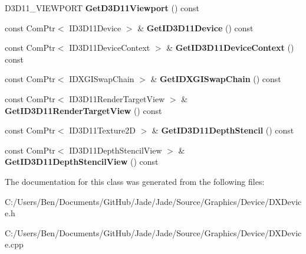 \begin{DoxyCompactItemize}
\item 
\hypertarget{class_jade_1_1_graphics_1_1_d_x_device_aa3125ed2e7a78054a4a1c2b1dd940c07}{}D3\+D11\+\_\+\+V\+I\+E\+W\+P\+O\+R\+T {\bfseries Get\+D3\+D11\+Viewport} () const \label{class_jade_1_1_graphics_1_1_d_x_device_aa3125ed2e7a78054a4a1c2b1dd940c07}

\item 
\hypertarget{class_jade_1_1_graphics_1_1_d_x_device_a93034c862df624df4bd5d4d43739484f}{}const Com\+Ptr$<$ I\+D3\+D11\+Device $>$ \& {\bfseries Get\+I\+D3\+D11\+Device} () const \label{class_jade_1_1_graphics_1_1_d_x_device_a93034c862df624df4bd5d4d43739484f}

\item 
\hypertarget{class_jade_1_1_graphics_1_1_d_x_device_abc53796dbbf1c43414e6f430eeb505d6}{}const Com\+Ptr$<$ I\+D3\+D11\+Device\+Context $>$ \& {\bfseries Get\+I\+D3\+D11\+Device\+Context} () const \label{class_jade_1_1_graphics_1_1_d_x_device_abc53796dbbf1c43414e6f430eeb505d6}

\item 
\hypertarget{class_jade_1_1_graphics_1_1_d_x_device_a1b7881f30cca027fded3e615ac1beaea}{}const Com\+Ptr$<$ I\+D\+X\+G\+I\+Swap\+Chain $>$ \& {\bfseries Get\+I\+D\+X\+G\+I\+Swap\+Chain} () const \label{class_jade_1_1_graphics_1_1_d_x_device_a1b7881f30cca027fded3e615ac1beaea}

\item 
\hypertarget{class_jade_1_1_graphics_1_1_d_x_device_ad5a661a79d3ae471289df4c2307dc3e9}{}const Com\+Ptr$<$ I\+D3\+D11\+Render\+Target\+View $>$ \& {\bfseries Get\+I\+D3\+D11\+Render\+Target\+View} () const \label{class_jade_1_1_graphics_1_1_d_x_device_ad5a661a79d3ae471289df4c2307dc3e9}

\item 
\hypertarget{class_jade_1_1_graphics_1_1_d_x_device_a57e9b08a324df77e26feb5d9ad54a772}{}const Com\+Ptr$<$ I\+D3\+D11\+Texture2\+D $>$ \& {\bfseries Get\+I\+D3\+D11\+Depth\+Stencil} () const \label{class_jade_1_1_graphics_1_1_d_x_device_a57e9b08a324df77e26feb5d9ad54a772}

\item 
\hypertarget{class_jade_1_1_graphics_1_1_d_x_device_a603db8b80c1427741e1bb0682e8581ab}{}const Com\+Ptr$<$ I\+D3\+D11\+Depth\+Stencil\+View $>$ \& {\bfseries Get\+I\+D3\+D11\+Depth\+Stencil\+View} () const \label{class_jade_1_1_graphics_1_1_d_x_device_a603db8b80c1427741e1bb0682e8581ab}

\end{DoxyCompactItemize}


The documentation for this class was generated from the following files\+:\begin{DoxyCompactItemize}
\item 
C\+:/\+Users/\+Ben/\+Documents/\+Git\+Hub/\+Jade/\+Jade/\+Source/\+Graphics/\+Device/D\+X\+Device.\+h\item 
C\+:/\+Users/\+Ben/\+Documents/\+Git\+Hub/\+Jade/\+Jade/\+Source/\+Graphics/\+Device/D\+X\+Device.\+cpp\end{DoxyCompactItemize}
